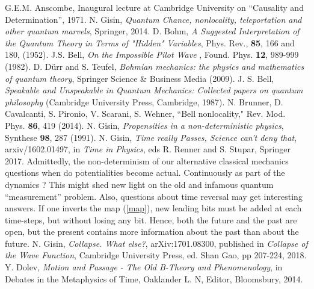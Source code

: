 \documentclass[floatfix,12pt]{article}
\begin{document}
\begin{thebibliography}{99}
 G.E.M. Anscombe, Inaugural lecture at Cambridge University on “Causality and Determination”, 1971.
 N. Gisin, {\it Quantum Chance, nonlocality, teleportation and other quantum marvels}, Springer, 2014.
D. Bohm, {\it A Suggested Interpretation of the Quantum Theory in Terms of "Hidden" Variables}, Phys. Rev., {\bf85}, 166 and 180, (1952).
 J.S. Bell, {\it On the Impossible Pilot Wave }, Found. Phys. {\bf 12}, 989-999 (1982).
 D. D\"urr and S. Teufel, {\it Bohmian mechanics: the physics and mathematics of quantum theory}, Springer Science \& Business Media (2009).
 J. S.  Bell,
      \textit{Speakable and Unspeakable in Quantum Mechanics:
      Collected papers on quantum philosophy} 
      (Cambridge University Press, Cambridge, 1987).
 N. Brunner, D. Cavalcanti, S. Pironio, V. Scarani, S. Wehner, ``Bell nonlocality," Rev. Mod. Phys. {\bf 86}, 419 (2014).
 N. Gisin, {\it Propensities in a non-deterministic physics}, Synthese {\bf 98}, 287 (1991).
 N. Gisin, {\it Time really Passes, Science can't deny that}, arxiv/1602.01497, in {\it Time in Physics}, eds R. Renner and S. Stupar, Springer 2017.
 Admittedly, the non-determinism of our alternative classical mechanics questions when do potentialities become actual. Continuously as part of the dynamics \cite{CollapseWhatElse}? This might shed new light on the old and infamous quantum ``measurement'' problem. Also, questions about time reversal may get interesting answers. If one inverts the map (\ref{map}), new leading bits must be added at each time-steps, but without losing any bit. Hence, both the future and the past are open, but the present contains more information about the past than about the future.
 N. Gisin, {\it Collapse. What else?}, arXiv:1701.08300, published in {\it Collapse of the Wave Function}, Cambridge University Press, ed. Shan Gao, pp 207-224, 2018.
 Y. Dolev, {\it Motion and Passage - The Old B-Theory and Phenomenology}, in Debates in the Metaphysics of Time,  Oaklander L. N, Editor, Bloomsbury, 2014.

\end{thebibliography}
\end{document}
